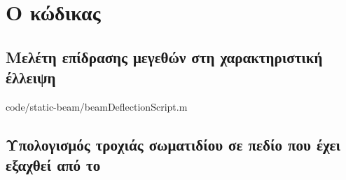 \chapter{Ο κώδικας }
\section{Μελέτη επίδρασης μεγεθών στη χαρακτηριστική έλλειψη}

{code/static-beam/beamDeflectionScript.m}



\section{Υπολογισμός τροχιάς σωματιδίου σε πεδίο που έχει εξαχθεί από το }












